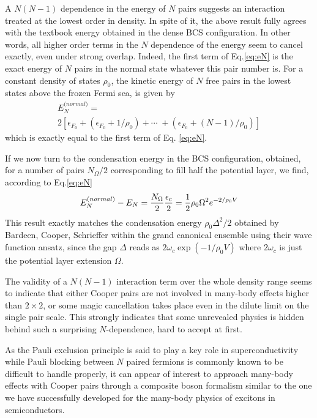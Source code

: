 \documentclass[epj]{svjour}
\begin{document}
A $N(N-1)$ dependence in the energy of $N$ pairs suggests an interaction treated at the  lowest order in density. In spite of it, the above result fully agrees with the textbook energy obtained in the dense BCS configuration. In other words, all higher order terms in the $N$ dependence of the energy seem to cancel exactly, even under strong overlap.  Indeed, the first term of Eq.\eqref{eq:eN} is
the exact energy of $N$ pairs in the normal state whatever this pair number is. For a constant density of states $\rho _{0}$, the kinetic energy of $N$ free pairs in the lowest states above the frozen Fermi sea, is given by
\begin{multline}
{E}_{N}^{\text{(}normal)}= \\
2\left[\epsilon _{F_{0}}+\left( \epsilon _{F_{0}}+1/\rho _{0}\right) +\cdots
\;+\left( \epsilon _{F_{0}}+(N-1)/\rho _{0}\right)\right]
\end{multline}%
which is exactly equal to the first term of Eq. \eqref{eq:eN}.

If we now turn to the condensation energy in the BCS configuration, obtained, for a number of pairs $N_\Omega/2$ corresponding to fill half the potential layer, we find,  according to Eq.\eqref{eq:eN}  
\begin{equation}
{E}_{N}^{\text{(}normal)}-{E}_{N}=\frac{N_{\Omega }}{2}\frac{%
\epsilon _{c}}{2}=\frac{1}{2}\rho _{0}\Omega ^{2}e^{-2/\rho _{0}V}
\end{equation}%
This result exactly matches the condensation energy  $\rho _{0}\Delta ^{2}/2$ obtained by Bardeen, Cooper, Schrieffer within the grand canonical
ensemble using their wave function ansatz, since the gap $\Delta $ reads as $%
2\omega _{c}\exp \left( -1/\rho _{0}V\right) $ where $2\omega _{c}$ is just the
potential layer extension $\Omega $. 

The validity of a $N(N-1)$ interaction term over the whole density range seems to indicate that either Cooper pairs are not involved in many-body effects higher than $2\times2$, or some magic cancellation takes place even in the dilute limit on the single pair scale. This strongly indicates that some unrevealed physics is hidden behind such a  surprising $N$-dependence, hard to accept at first. 

As the Pauli exclusion principle is said to play a key role in superconductivity while Pauli blocking between $N$ paired fermions is commonly known to be difficult to handle properly, it can appear of interest to approach many-body effects with Cooper pairs through a composite boson formalism similar to the one we have successfully developed for the many-body physics of excitons in semiconductors\cite
{CobosonPhysicsReports}.
\end{document}
